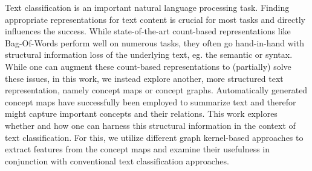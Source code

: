 Text classification is an important natural language processing task. 
Finding appropriate representations for text content is crucial for most tasks and directly influences the success.
While state-of-the-art count-based representations like Bag-Of-Words perform well on numerous tasks, they often go hand-in-hand with structural information loss of the underlying text, eg. the semantic or syntax.
While one can augment these count-based representations to (partially) solve these issues, in this work, we instead explore another, more structured text representation, namely concept maps or concept graphs.
Automatically generated concept maps have successfully been employed to summarize text and therefor might capture important concepts and their relations.
This work explores whether and how one can harness this structural information in the context of text classification.
For this, we utilize different graph kernel-based approaches to extract features from the concept maps and examine their usefulness in conjunction with conventional text classification approaches.